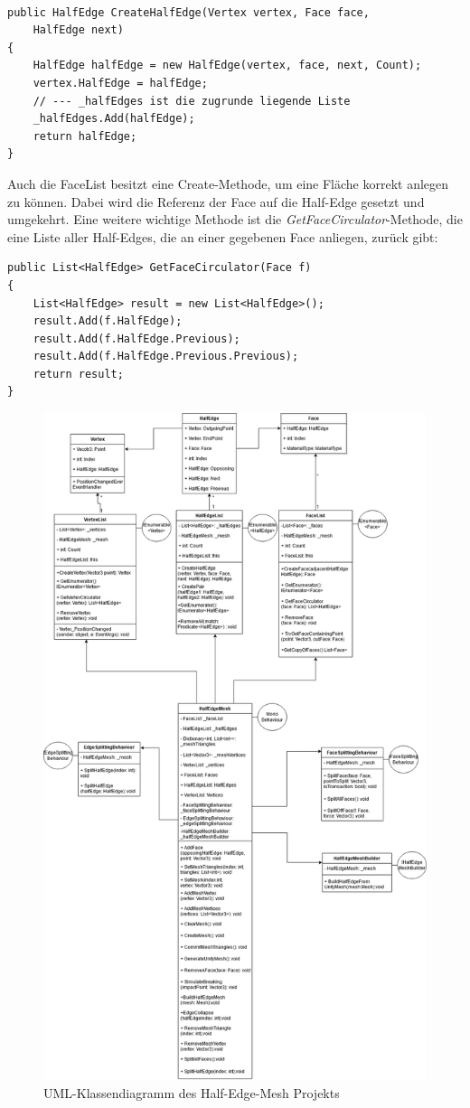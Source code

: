 \begin{lstlisting}

public HalfEdge CreateHalfEdge(Vertex vertex, Face face, 
	HalfEdge next)
{
	HalfEdge halfEdge = new HalfEdge(vertex, face, next, Count);
	vertex.HalfEdge = halfEdge;
	// --- _halfEdges ist die zugrunde liegende Liste
	_halfEdges.Add(halfEdge);
	return halfEdge;
}

\end{lstlisting}

Auch die FaceList besitzt eine Create-Methode, um eine Fl\"ache korrekt anlegen zu k\"onnen. Dabei wird die Referenz der Face auf die Half-Edge gesetzt und umgekehrt. Eine weitere wichtige Methode ist die \textit{GetFaceCirculator}-Methode, die eine Liste aller Half-Edges, die an einer gegebenen Face anliegen, zur\"uck gibt:

\begin{lstlisting}
public List<HalfEdge> GetFaceCirculator(Face f)
{
	List<HalfEdge> result = new List<HalfEdge>();
	result.Add(f.HalfEdge);
	result.Add(f.HalfEdge.Previous);
	result.Add(f.HalfEdge.Previous.Previous);
	return result;
}
\end{lstlisting}

\begin{figure}[t]
	\centering
	\includegraphics[width=0.7\linewidth]{Images/ClassDiagramHalfEdgeMesh}
	\caption[HalfEdgeMeshUMLDiagramm]{UML-Klassendiagramm des Half-Edge-Mesh Projekts}
	\label{fig:classdiagramhalfedgemesh}
\end{figure}


